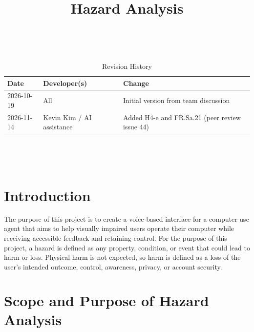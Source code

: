 \documentclass{article}
\title{Hazard Analysis\\\progname}
\author{\authname}
\date{}
\begin{document}
\maketitle
\thispagestyle{empty}

~\newpage


\begin{table}[hp]
\caption{Revision History} \label{TblRevisionHistory}
\begin{tabularx}{\textwidth}{llX}
\toprule
\textbf{Date} & \textbf{Developer(s)} & \textbf{Change}\\
\midrule
2026-10-19 & All & Initial version from team discussion\\
2026-11-14 & Kevin Kim / AI assistance & Added H4-e and FR.Sa.21 (peer review issue 44)\\
\bottomrule
\end{tabularx}
\end{table}

~\newpage

\tableofcontents

\listoftables

~\newpage


\section{Introduction}

The purpose of this project is to create a voice-based interface for a computer-use agent that aims to help visually impaired users operate their computer while receiving accessible feedback and retaining control. 
For the purpose of this project, a hazard is defined as any property, condition, or event that could lead to harm or loss. 
Physical harm is not expected, so harm is defined as a loss of the user's intended outcome, control, awareness, privacy, or account security. 


\section{Scope and Purpose of Hazard Analysis}
\end{document}
